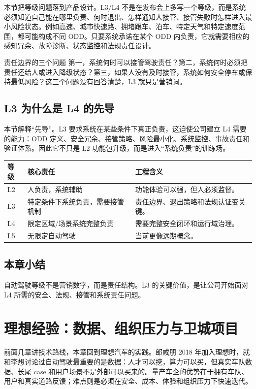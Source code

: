\documentclass[a4paper]{article}
\begin{document}
本节把等级问题落到产品设计。L3/L4 不是在发布会上多写一个等级，而是系统必须知道自己能在哪里负责、何时退出、怎样通知人接管、接管失败时怎样进入最小风险状态。例如高速、城市快速路、拥堵跟车、泊车、特定天气和特定速度范围，都可能构成不同 ODD。只要系统承诺在某个 ODD 内负责，它就需要相应的感知冗余、故障诊断、状态监控和法规责任设计。

\begin{importantbox}{责任边界的三个问题}
第一，系统何时可以接管驾驶责任？第二，系统何时必须把责任还给人或进入降级状态？第三，如果人没有及时接管，系统如何安全停车或保持最低风险？这三个问题没有回答清楚，L3 就只是营销词。
\end{importantbox}

\subsection{L3 为什么是 L4 的先导}

本节解释“先导”。L3 要求系统在某些条件下真正负责，这迫使公司建立 L4 需要的能力：ODD 定义、安全冗余、接管策略、风险最小化、系统监控、事故责任和验证体系。因此它不只是 L2 功能包升级，而是进入“系统负责”的训练场。

\noindent\begin{tabularx}{\textwidth}{p{}p{}X}
\toprule
等级 & 核心责任 & 工程含义 \\
\midrule
L2 & 人负责，系统辅助 & 功能体验可以强，但人必须监督。 \\
L3 & 特定条件下系统负责，需要接管机制 & 责任边界、退出策略和法规认证变关键。 \\
L4 & 限定区域/场景系统完整负责 & 需要完整安全闭环和运行域治理。 \\
L5 & 无限定自动驾驶 & 当前更像远期概念。 \\
\bottomrule
\end{tabularx}

\subsection{本章小结}

自动驾驶等级不是营销数字，而是责任结构。L3 的关键价值，是让公司开始面对 L4 所需的安全、法规、接管和系统责任问题。

\section{理想经验：数据、组织压力与卫城项目}

前面几章讲技术路线，本章回到理想汽车的实践。郎咸朋 2018 年加入理想时，就和李想讨论过自动驾驶最重要的是数据：人才可以挖，算力可以买，但真实车队数据、长尾 case 和用户场景不是外部可以买来的。量产车企的优势在于拥有车队、用户和真实道路反馈；难点则是必须在安全、成本、体验和组织压力下快速迭代。
\end{document}
